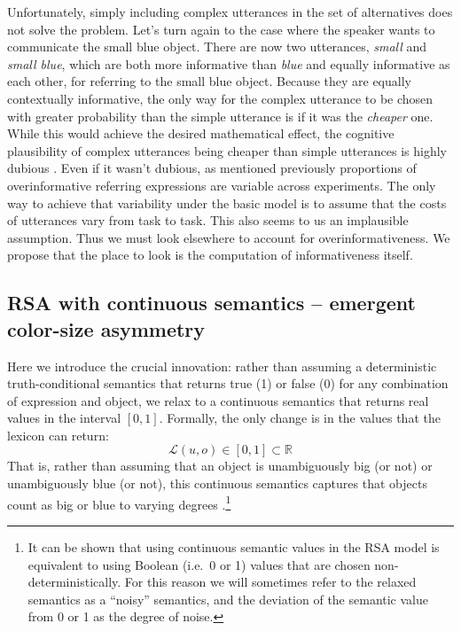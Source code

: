 \documentclass[11pt]{article}
\begin{document}
Unfortunately, simply including complex utterances in the set of alternatives does not solve the problem. Let's turn again to the case where the speaker wants to communicate the small blue object. There are now two  utterances, \emph{small} and \emph{small blue}, which are both more informative than \emph{blue} and equally informative as each other, for referring to the small blue object. Because they are equally contextually informative, the only way for the complex utterance to be chosen with greater probability than the simple utterance is if it was the \emph{cheaper} one. While this would achieve the desired mathematical effect, the cognitive plausibility of complex utterances being cheaper than simple utterances is highly dubious \cite<see also the discussion of cost functions in>[who explicitly introduce this monotonicity constraint as a constraint on the search space of possible referring expressions within a graph-based framework]{Krahmer2003}. Even if it wasn't dubious, as  mentioned previously proportions of overinformative referring expressions are variable across experiments. The only way to achieve that variability under the basic model is to assume that the costs of utterances vary from task to task. This also seems to us an implausible assumption. Thus we must look elsewhere to account for overinformativeness. We propose that the place to look is the computation of informativeness itself. 



\subsection{RSA with continuous semantics -- emergent color-size asymmetry}
\label{sec:modifiedmodel}

Here we introduce the crucial innovation: rather than assuming a deterministic truth-conditional semantics that returns true (1) or false (0) for any combination of expression and object, we relax to a continuous semantics that returns real values in the interval $[0,1]$. 
Formally, the only change is in the values that the lexicon can return:
\begin{equation}
\mathcal{L}(u,o) \in [0, 1] \subset \mathbb{R}
\end{equation}
That is, rather than assuming that an object is unambiguously big (or not) or unambiguously blue (or not), this continuous semantics captures that objects count as big or blue to  varying degrees \cite<similar to approaches in fuzzy logic and prototype theory,>{zadeh1965fuzzy, Rosch1973}.\footnote{It can be shown that using continuous semantic values in the RSA model is equivalent to using Boolean (i.e.~0 or 1) values that are chosen non-deterministically. For this reason we will sometimes refer to the relaxed semantics as a ``noisy'' semantics, and the deviation of the semantic value from 0 or 1 as the degree of noise.}
\end{document}
